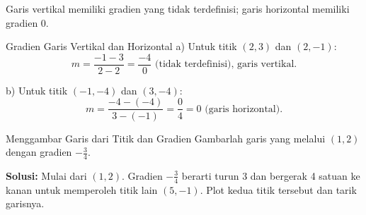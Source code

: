 Garis vertikal memiliki gradien yang tidak terdefinisi; garis horizontal memiliki gradien 0.

\begin{example}{Gradien Garis Vertikal dan Horizontal}\label{exa:vertical-horizontal-slope}
a) Untuk titik \((2,3)\) dan \((2,-1)\):
\[
m=\frac{-1-3}{2-2}=\frac{-4}{0} \text{ (tidak terdefinisi), garis vertikal.}
\]

b) Untuk titik \((-1,-4)\) dan \((3,-4)\):
\[
m=\frac{-4-(-4)}{3-(-1)}=\frac{0}{4}=0 \text{ (garis horizontal).}
\]
\end{example}

\begin{example}{Menggambar Garis dari Titik dan Gradien}\label{exa:point-slope-graph}
Gambarlah garis yang melalui \((1,2)\) dengan gradien \(-\frac{3}{4}\).

\textbf{Solusi:} Mulai dari \((1,2)\). Gradien \(-\frac{3}{4}\) berarti turun 3 dan bergerak 4 satuan ke kanan untuk memperoleh titik lain \((5,-1)\). Plot kedua titik tersebut dan tarik garisnya.
\begin{center}
\par{}\label{fig:equations-and-lines-new-tikz08}%

\end{center}
\end{example}

